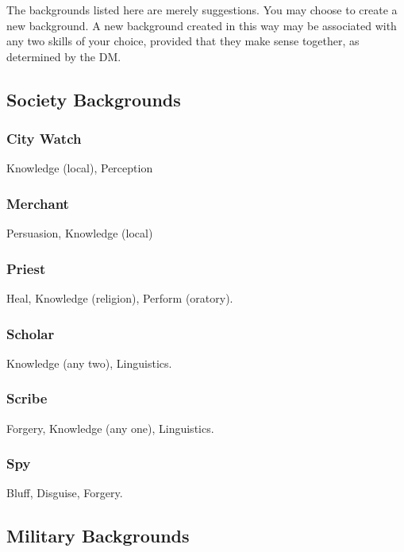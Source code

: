 The backgrounds listed here are merely suggestions. You may choose to create a new background. A new background created in this way may be associated with any two skills of your choice, provided that they make sense together, as determined by the DM.


\subsection{Society Backgrounds}

\subsubsection{City Watch}
 Knowledge (local), Perception

\subsubsection{Merchant}
 Persuasion, Knowledge (local)

\subsubsection{Priest}
 Heal, Knowledge (religion), Perform (oratory).

\subsubsection{Scholar}
 Knowledge (any two), Linguistics.

\subsubsection{Scribe}
 Forgery, Knowledge (any one), Linguistics.

\subsubsection{Spy}
 Bluff, Disguise, Forgery.

\subsection{Military Backgrounds}


